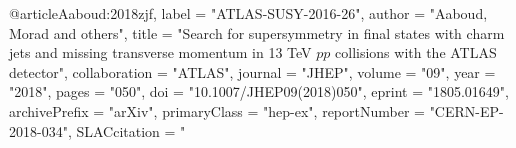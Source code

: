 @article{Aaboud:2018zjf,
      label          = "ATLAS-SUSY-2016-26",
      author         = "Aaboud, Morad and others",
      title          = "{Search for supersymmetry in final states with charm jets
                        and missing transverse momentum in 13 TeV $pp$ collisions
                        with the ATLAS detector}",
      collaboration  = "ATLAS",
      journal        = "JHEP",
      volume         = "09",
      year           = "2018",
      pages          = "050",
      doi            = "10.1007/JHEP09(2018)050",
      eprint         = "1805.01649",
      archivePrefix  = "arXiv",
      primaryClass   = "hep-ex",
      reportNumber   = "CERN-EP-2018-034",
      SLACcitation   = "%
}


